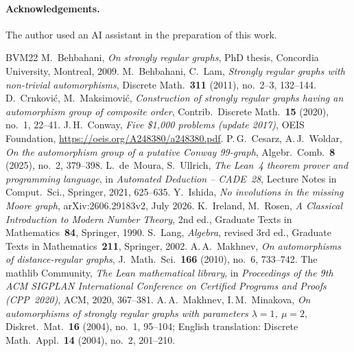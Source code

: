 \documentclass[11pt,a4paper]{article}
\theoremstyle{remark}
\begin{document}
\paragraph{Acknowledgements.} The author used an AI assistant in the preparation of this work.

{\small\raggedright
\begin{thebibliography}{BVM22}
 M.~Behbahani, \emph{On strongly regular graphs}, PhD thesis, Concordia University, Montreal, 2009.
 M.~Behbahani, C.~Lam, \emph{Strongly regular graphs with non-trivial automorphisms}, Discrete
Math.\ \textbf{311} (2011), no.~2--3, 132--144.
 D.~Crnkovi\'c, M.~Maksimovi\'c, \emph{Construction of strongly regular graphs having an
automorphism group of composite order}, Contrib.\ Discrete Math.\ \textbf{15} (2020), no.~1, 22--41.
 J.\,H.~Conway, \emph{Five \$1,000 problems (update 2017)}, OEIS Foundation,
\url{https://oeis.org/A248380/a248380.pdf}.
 P.\,G.~Cesarz, A.\,J.~Woldar, \emph{On the automorphism group of a putative Conway 99-graph},
Algebr.\ Comb.\ \textbf{8} (2025), no.~2, 379--398.
 L.~de~Moura, S.~Ullrich, \emph{The Lean~4 theorem prover and programming language}, in
\emph{Automated Deduction -- CADE~28}, Lecture Notes in Comput.\ Sci., Springer, 2021, 625--635.
 Y.~Ishida, \emph{No involutions in the missing Moore graph}, arXiv:2606.29183v2, July 2026.
 K.~Ireland, M.~Rosen, \emph{A Classical Introduction to Modern Number Theory}, 2nd ed., Graduate
Texts in Mathematics~\textbf{84}, Springer, 1990.
 S.~Lang, \emph{Algebra}, revised 3rd ed., Graduate Texts in Mathematics~\textbf{211}, Springer, 2002.
 A.\,A.~Makhnev, \emph{On automorphisms of distance-regular graphs}, J.\ Math.\ Sci.\
\textbf{166} (2010), no.~6, 733--742.
 The mathlib Community, \emph{The Lean mathematical library}, in \emph{Proceedings of the 9th
ACM SIGPLAN International Conference on Certified Programs and Proofs (CPP~2020)}, ACM, 2020, 367--381.
\bibitem[MM04]{MM04} A.\,A.~Makhnev, I.\,M.~Minakova, \emph{On automorphisms of strongly regular graphs with
parameters $\lambda=1$, $\mu=2$}, Diskret.\ Mat.\ \textbf{16} (2004), no.~1, 95--104; English translation: Discrete
Math.\ Appl.\ \textbf{14} (2004), no.~2, 201--210.
\end{thebibliography}
}
\end{document}
